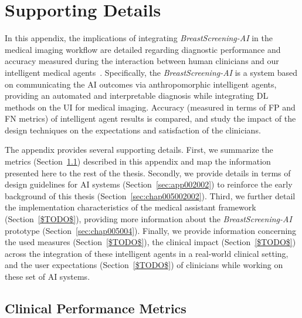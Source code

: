 \chapter{Supporting Details}
\label{chap:app002}


In this appendix, the implications of integrating {\it BreastScreening-AI} in the medical imaging workflow are detailed regarding diagnostic performance and accuracy measured during the interaction between human clinicians and our intelligent medical agents~\cite{CALISTO2022102285}.
Specifically, the {\it BreastScreening-AI} is a system based on communicating the \ac{AI} outcomes via anthropomorphic intelligent agents, providing an automated and interpretable diagnosis while integrating \ac{DL} methods on the \ac{UI} for medical imaging.
Accuracy (measured in terms of \ac{FP} and \ac{FN} metrics) of intelligent agent results is compared, and study the impact of the design techniques on the expectations and satisfaction of the clinicians.

The appendix provides several supporting details.
First, we summarize the metrics (Section~\ref{sec:app002001}) described in this appendix and map the information presented here to the rest of the thesis.
Secondly, we provide details in terms of design guidelines for \ac{AI} systems (Section~\ref{sec:app002002}) to reinforce the early background of this thesis (Section~\ref{sec:chap005002002}).
Third, we further detail the implementation characteristics of the medical assistant framework (Section~\ref{$TODO$}), providing more information about the {\it BreastScreening-AI} prototype (Section~\ref{sec:chap005004}).
Finally, we provide information concerning the used measures (Section~\ref{$TODO$}), the clinical impact (Section~\ref{$TODO$}) across the integration of these intelligent agents in a real-world clinical setting, and the user expectations (Section~\ref{$TODO$}) of clinicians while working on these set of \ac{AI} systems.

\section{Clinical Performance Metrics}
\label{sec:app002001}

